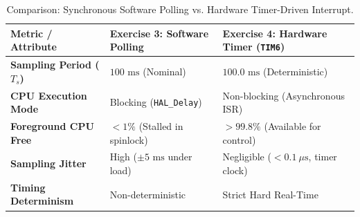 \begin{table}[htbp]
    \centering
    \footnotesize
    \caption{Comparison: Synchronous Software Polling vs. Hardware Timer-Driven Interrupt.}
    \label{tab:polling_vs_timer}
    \begin{tabularx}{\textwidth}{p{3.8cm} X X}
        \toprule
        \textbf{Metric / Attribute} & \textbf{Exercise 3: Software Polling} & \textbf{Exercise 4: Hardware Timer (\texttt{TIM6})} \\
        \midrule
        \textbf{Sampling Period ($T_s$)} & $100\text{ ms}$ (Nominal) & $100.0\text{ ms}$ (Deterministic) \\
        \textbf{CPU Execution Mode} & Blocking (\texttt{HAL\_Delay}) & Non-blocking (Asynchronous ISR) \\
        \textbf{Foreground CPU Free} & $< 1\%$ (Stalled in spinlock) & $> 99.8\%$ (Available for control) \\
        \textbf{Sampling Jitter} & High ($\pm 5\text{ ms}$ under load) & Negligible ($< 0.1\ \mu\text{s}$, timer clock) \\
        \textbf{Timing Determinism} & Non-deterministic & Strict Hard Real-Time \\
        \bottomrule
    \end{tabularx}
    \vspace{-4pt}
\end{table}


